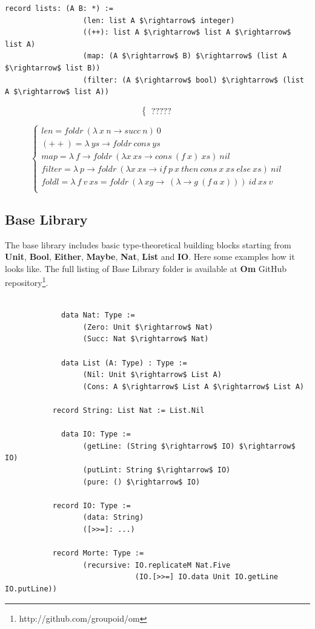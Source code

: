 \documentclass{aip-cp}
\begin{document}
\begin{lstlisting}[mathescape=true]
           record lists: (A B: *) :=
                  (len: list A $\rightarrow$ integer)
                  ((++): list A $\rightarrow$ list A $\rightarrow$ list A)
                  (map: (A $\rightarrow$ B) $\rightarrow$ (list A $\rightarrow$ list B))
                  (filter: (A $\rightarrow$ bool) $\rightarrow$ (list A $\rightarrow$ list A))
\end{lstlisting}

$$
\begin{cases}
?????
\end{cases}
$$

$$
\begin{cases}
len = foldr\ (\lambda\ x\ n \rightarrow succ\ n)\ 0\\
(++) = \lambda\ ys \rightarrow foldr\ cons\ ys\\
map = \lambda\ f \rightarrow foldr\ (\lambda x\ xs \rightarrow cons\ (f\ x)\ xs)\ nil\\
filter = \lambda\ p \rightarrow foldr\ (\lambda x\ xs \rightarrow if\ p\ x\ then\ cons\ x\ xs\ else\ xs)\ nil\\
foldl = \lambda\ f\ v\ xs = foldr\ (\lambda\ xg\rightarrow\ (\lambda \rightarrow g\ (f\ a\ x)))\ id\ xs\ v\\
\end{cases}
$$

\subsection{Base Library}
The base library includes basic type-theoretical building blocks starting from {\bf Unit}, {\bf Bool}, {\bf Either}, {\bf Maybe}, {\bf Nat}, {\bf List} and {\bf IO}.
Here some examples how it looks like.
The full listing of Base Library folder is available at {\bf Om} GitHub repository\footnote{http://github.com/groupoid/om}.

\begin{lstlisting}[mathescape=true]

             data Nat: Type :=
                  (Zero: Unit $\rightarrow$ Nat)
                  (Succ: Nat $\rightarrow$ Nat)

             data List (A: Type) : Type :=
                  (Nil: Unit $\rightarrow$ List A)
                  (Cons: A $\rightarrow$ List A $\rightarrow$ List A)

           record String: List Nat := List.Nil

             data IO: Type :=
                  (getLine: (String $\rightarrow$ IO) $\rightarrow$ IO)
                  (putLint: String $\rightarrow$ IO)
                  (pure: () $\rightarrow$ IO)

           record IO: Type :=
                  (data: String)
                  ([>>=]: ...)

           record Morte: Type :=
                  (recursive: IO.replicateM Nat.Five
                              (IO.[>>=] IO.data Unit IO.getLine IO.putLine))

\end{lstlisting}
\end{document}
